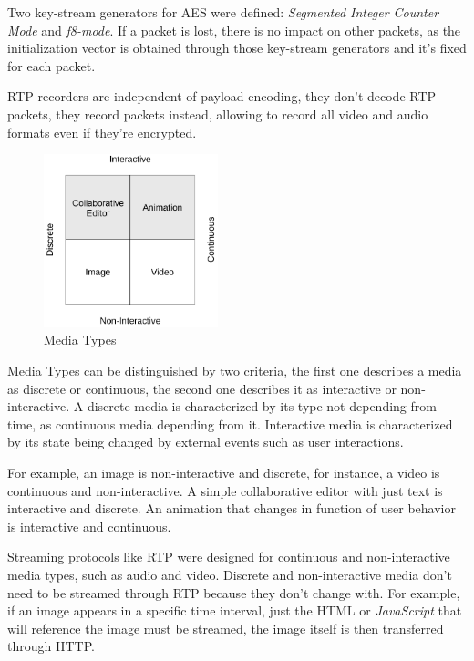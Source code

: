   Two key-stream generators for \ac{AES} were defined: \emph{Segmented Integer Counter Mode} and \emph{f8-mode}. If a packet is lost, there is no impact on other packets, as the initialization vector is obtained through those key-stream generators and it's fixed for each packet.

  \ac{RTP} recorders are independent of payload encoding, they don't decode \ac{RTP} packets, they record packets instead, allowing to record all video and audio formats even if they're encrypted.

\begin{figure}[H]
	\centering
	\includegraphics[width=0.45\textwidth]{figures/media_types.png}
	\caption{Media Types}
\end{figure}

	Media Types can be distinguished by two criteria, the first one describes a media as discrete or continuous, the second one describes it as interactive or non-interactive. A discrete media is characterized by its type not depending from time, as continuous media depending from it. Interactive media is characterized by its state being changed by external events such as user interactions.

	For example, an image is non-interactive and discrete, for instance, a video is continuous and non-interactive. A simple collaborative editor with just text is interactive and discrete. An animation that changes in function of user behavior is interactive and continuous.

	Streaming protocols like \ac {RTP} were designed for continuous and non-interactive media types, such as audio and video. Discrete and non-interactive media don't need to be streamed through \ac{RTP} because they don't change with. For example, if an image appears in a specific time interval, just the \ac{HTML} or \emph{JavaScript} that will reference the image must be streamed, the image itself is then transferred through \ac{HTTP}.

